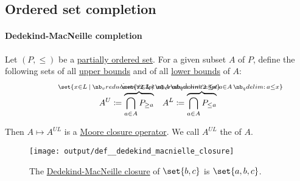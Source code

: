 \subsection{Ordered set completion}\label{subsec:ordered_set_completion}

\paragraph{Dedekind-MacNeille completion}

\begin{definition}\label{def:dedekind_macnielle_closure}\mimprovised
  Let \( (P, \leq) \) be a \hyperref[def:partially_ordered_set]{partially ordered set}. For a given subset \( A \) of \( P \), define the following sets of all \hyperref[def:extremal_points/bounds]{upper bounds} and of all \hyperref[def:extremal_points/bounds]{lower bounds} of \( A \):
  \begin{align*}
    A^U \coloneqq \overbrace{\bigcap_{a \in A} P_{\geq a}}^{\mathclap{\set{ x \in L \given \qforall {a \in A} x \leq a }}}
    &&
    A^L \coloneqq \overbrace{\bigcap_{a \in A} P_{\leq a}}^{\mathclap{\set{ x \in L \given \qforall {a \in A} a \leq x }}}
  \end{align*}

  Then \( A \mapsto A^{UL} \) is a \hyperref[def:moore_closure_operator]{Moore closure operator}. We call \( A^{UL} \) the  of \( A \).

  \begin{figure}[!ht]
    \centering
    \texttt{[image: output/def\_\_dedekind\_macnielle\_closure]}
    \caption{The \hyperref[def:dedekind_macnielle_completion]{Dedekind-MacNeille closure} of \( \set{ b, c } \) is \( \set{ a, b, c } \).}\label{fig:def:dedekind_macnielle_closure}
  \end{figure}
\end{definition}
